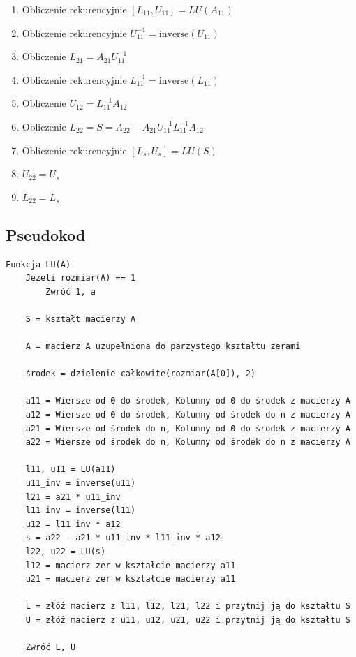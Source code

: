 \documentclass{article}
\begin{document}
\bigbreak

\begin{enumerate}
    \item Obliczenie rekurencyjnie $[L_{11}, U_{11}] = LU(A_{11})$
    \item Obliczenie rekurencyjnie $U_{11}^{-1} = \text{inverse}(U_{11})$
    \item Obliczenie $L_{21} = A_{21} U_{11}^{-1}$
    \item Obliczenie rekurencyjnie $L_{11}^{-1} = \text{inverse}(L_{11})$
    \item Obliczenie $U_{12} = L_{11}^{-1} A_{12}$
    \item Obliczenie $L_{22} = S = A_{22} - A_{21} U_{11}^{-1} L_{11}^{-1} A_{12}$
    \item Obliczenie rekurencyjnie $[L_s, U_s] = LU(S)$
    \item $U_{22} = U_s$
    \item $L_{22} = L_s$
\end{enumerate}


\subsection{Pseudokod}

\begin{verbatim}
Funkcja LU(A)
    Jeżeli rozmiar(A) == 1
        Zwróć 1, a

    S = kształt macierzy A

    A = macierz A uzupełniona do parzystego kształtu zerami

    środek = dzielenie_całkowite(rozmiar(A[0]), 2) 
    
    a11 = Wiersze od 0 do środek, Kolumny od 0 do środek z macierzy A
    a12 = Wiersze od 0 do środek, Kolumny od środek do n z macierzy A
    a21 = Wiersze od środek do n, Kolumny od 0 do środek z macierzy A
    a22 = Wiersze od środek do n, Kolumny od środek do n z macierzy A
    
    l11, u11 = LU(a11)
    u11_inv = inverse(u11)
    l21 = a21 * u11_inv
    l11_inv = inverse(l11)
    u12 = l11_inv * a12
    s = a22 - a21 * u11_inv * l11_inv * a12
    l22, u22 = LU(s)
    l12 = macierz zer w kształcie macierzy a11
    u21 = macierz zer w kształcie macierzy a11

    L = złóż macierz z l11, l12, l21, l22 i przytnij ją do kształtu S
    U = złóż macierz z u11, u12, u21, u22 i przytnij ją do kształtu S
    
    Zwróć L, U
\end{verbatim}
\end{document}

